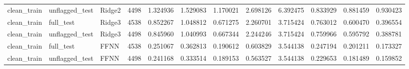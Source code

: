 \begin{tabular}{lllrrrrrrrrr}
clean_train & unflagged_test & Ridge2 & 4498 & 1.324936 & 1.529083 & 1.170021 & 2.698126 & 6.392475 & 0.833929 & 0.881459 & 0.930423 \\
clean_train & full_test & Ridge3 & 4538 & 0.852267 & 1.048812 & 0.671275 & 2.260701 & 3.715424 & 0.763012 & 0.600470 & 0.396554 \\
clean_train & unflagged_test & Ridge3 & 4498 & 0.845960 & 1.040993 & 0.667344 & 2.244246 & 3.715424 & 0.759966 & 0.595792 & 0.388781 \\
clean_train & full_test & FFNN & 4538 & 0.251067 & 0.362813 & 0.190612 & 0.603829 & 3.544138 & 0.247194 & 0.201211 & 0.173327 \\
clean_train & unflagged_test & FFNN & 4498 & 0.241168 & 0.333514 & 0.189153 & 0.563527 & 3.544138 & 0.229653 & 0.181489 & 0.159852 \\
\bottomrule
\end{tabular}
